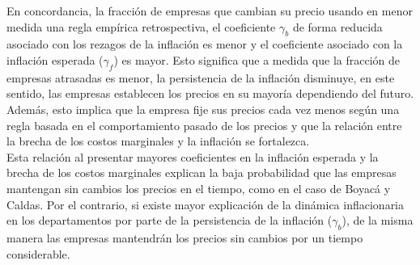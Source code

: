 En concordancia, la fracción de empresas que cambian su precio usando en menor medida una regla empírica retrospectiva, el coeficiente $\gamma_{b}$ de forma reducida asociado con los rezagos de la inflación es menor y el coeficiente asociado con la inflación esperada ($\gamma_{f}$) es mayor. Esto significa que a medida que la fracción de empresas atrasadas es menor, la persistencia de la inflación disminuye, en este sentido, las empresas establecen los precios en su mayoría dependiendo del futuro. Además, esto implica que la empresa fije sus precios cada vez menos según una regla basada en el comportamiento pasado de los precios y que la relación entre la brecha de los costos marginales y la inflación se fortalezca.\\

Esta relación al presentar mayores coeficientes en la inflación esperada y la brecha de los costos marginales explican la baja probabilidad que las empresas mantengan sin cambios los precios en el tiempo, como en el caso de Boyacá y Caldas. Por el contrario, si existe mayor explicación de la dinámica inflacionaria en los departamentos por parte de la persistencia de la inflación ($\gamma_{b}$), de la misma manera las empresas mantendrán los precios sin cambios por un tiempo considerable. \\


